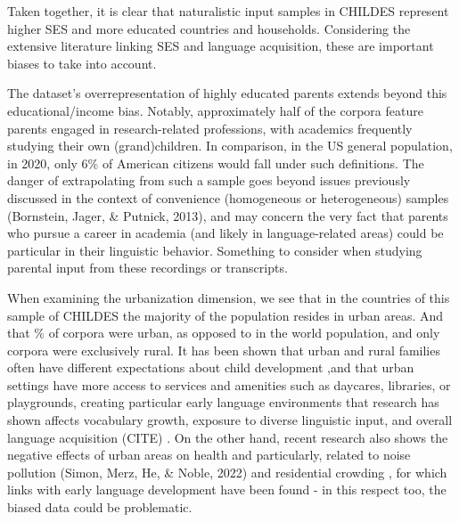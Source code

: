 \documentclass[
  man,floatsintext]{apa6}
\begin{document}
Taken together, it is clear that naturalistic input samples in CHILDES represent higher SES and more educated countries and households. Considering the extensive literature linking SES and language acquisition, these are important biases to take into account.

The dataset's overrepresentation of highly educated parents extends beyond this educational/income bias. Notably, approximately half of the corpora feature parents engaged in research-related professions, with academics frequently studying their own (grand)children. In comparison, in the US general population, in 2020, only 6\% of American citizens would fall under such definitions. The danger of extrapolating from such a sample goes beyond issues previously discussed in the context of convenience (homogeneous or heterogeneous) samples (Bornstein, Jager, \& Putnick, 2013), and may concern the very fact that parents who pursue a career in academia (and likely in language-related areas) could be particular in their linguistic behavior. Something to consider when studying parental input from these recordings or transcripts.

When examining the urbanization dimension, we see that in the countries of this sample of CHILDES the majority of the population resides in urban areas. And that \% of corpora were urban, as opposed to in the world population, and only corpora were exclusively rural. It has been shown that urban and rural families often have different expectations about child development ,and that urban settings have more access to services and amenities such as daycares, libraries, or playgrounds, creating particular early language environments that research has shown affects vocabulary growth, exposure to diverse linguistic input, and overall language acquisition (CITE) . On the other hand, recent research also shows the negative effects of urban areas on health and particularly, related to noise pollution (Simon, Merz, He, \& Noble, 2022) and residential crowding , for which links with early language development have been found - in this respect too, the biased data could be problematic.
\end{document}
